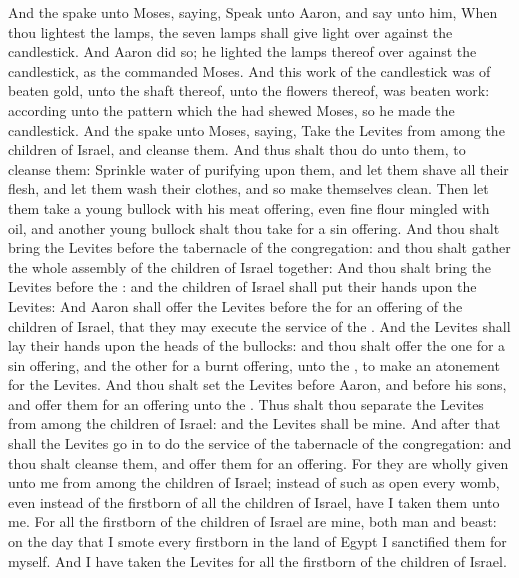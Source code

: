 \begin{biblechapter} %
 And the \LORD spake unto Moses, saying,
\verse Speak unto Aaron, and say unto him, When thou lightest the lamps, the seven lamps shall give light over against the candlestick.
\verse And Aaron did so; he lighted the lamps thereof over against the candlestick, as the \LORD commanded Moses.
\verse And this work of the candlestick was of beaten gold, unto the shaft thereof, unto the flowers thereof, was beaten work: according unto the pattern which the \LORD had shewed Moses, so he made the candlestick.
 And the \LORD spake unto Moses, saying,
\verse Take the Levites from among the children of Israel, and cleanse them.
\verse And thus shalt thou do unto them, to cleanse them: Sprinkle water of purifying upon them, and let them shave all their flesh, and let them wash their clothes, and so make themselves clean.
\verse Then let them take a young bullock with his meat offering, even fine flour mingled with oil, and another young bullock shalt thou take for a sin offering.
\verse And thou shalt bring the Levites before the tabernacle of the congregation: and thou shalt gather the whole assembly of the children of Israel together:
\verse And thou shalt bring the Levites before the \LORD: and the children of Israel shall put their hands upon the Levites:
\verse And Aaron shall offer the Levites before the \LORD for an offering of the children of Israel, that they may execute the service of the \LORD.
\verse And the Levites shall lay their hands upon the heads of the bullocks: and thou shalt offer the one for a sin offering, and the other for a burnt offering, unto the \LORD, to make an atonement for the Levites.
\verse And thou shalt set the Levites before Aaron, and before his sons, and offer them for an offering unto the \LORD.
\verse Thus shalt thou separate the Levites from among the children of Israel: and the Levites shall be mine.
\verse And after that shall the Levites go in to do the service of the tabernacle of the congregation: and thou shalt cleanse them, and offer them for an offering.
\verse For they are wholly given unto me from among the children of Israel; instead of such as open every womb, even instead of the firstborn of all the children of Israel, have I taken them unto me.
\verse For all the firstborn of the children of Israel are mine, both man and beast: on the day that I smote every firstborn in the land of Egypt I sanctified them for myself.
\verse And I have taken the Levites for all the firstborn of the children of Israel.

\end{biblechapter}
